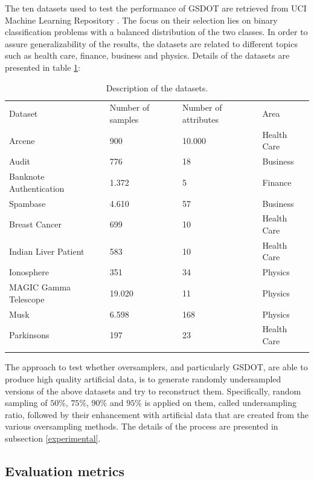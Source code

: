 The ten datasets used to test the performance of GSDOT are retrieved from UCI Machine Learning Repository \cite{Dua.2019}. The focus on their selection lies on binary classification problems with a balanced distribution of the two classes. In order to assure generalizability of the results, the datasets are related to different topics such as health care, finance, business and physics. Details of the datasets are presented in table \ref{tab:description}:

\begin{table}
  \centering
  \caption{\label{tab:datasets}Description of the datasets.}
  \label{tab:description}
  \begin{tabular}{llll}
  \hline\noalign{\smallskip}
  Dataset & Number of samples & Number of attributes & Area \\
  \noalign{\smallskip}\hline\noalign{\smallskip}
  Arcene & 900 & 10.000 & Health Care \\
	Audit & 776 & 18 & Business \\
	Banknote Authentication & 1.372 & 5 & Finance \\
	Spambase & 4.610 & 57 & Business\\
	Breast Cancer & 699 & 10 & Health Care\\
	Indian Liver Patient & 583 & 10 & Health Care\\
	Ionosphere & 351 & 34 & Physics\\
	MAGIC Gamma Telescope & 19.020 & 11 & Physics\\
	Musk & 6.598 & 168 & Physics\\
	Parkinsons & 197 & 23 & Health Care\\
  \noalign{\smallskip}\hline
  \end{tabular}
\end{table}

The approach to test whether oversamplers, and particularly GSDOT, are able to produce high quality artificial data, is to generate randomly undersampled versions of the above datasets and try to reconstruct them. Specifically, random sampling of $50\%$, $75\%$, $90\%$ and $95\%$ is applied on them, called undersampling ratio, followed by their enhancement with artificial data that are created from the various oversampling methods. The details of the process are presented in subsection \ref{experimental}.

\subsection{Evaluation metrics}

